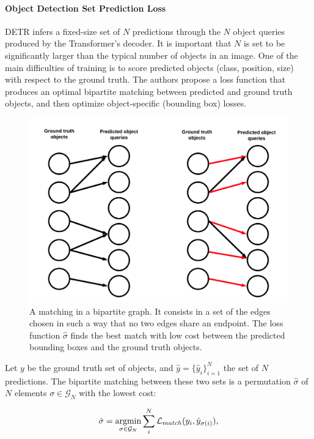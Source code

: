 \paragraph{Object Detection Set Prediction Loss} DETR \cite{detr} infers a fixed-size set of $N$ predictions through the $N$ object queries produced by the Transformer's decoder. It is important that $N$ is set to be significantly larger than the typical number of objects in an image. One of the main difficulties of training is to score predicted objects (class, position, size) with respect to the ground truth. The authors propose a loss function that produces
an optimal bipartite matching between predicted and ground truth objects, and
then optimize object-specific (bounding box) losses. 

\begin{figure}[h!]
	\centering
	\includegraphics[width=0.8\linewidth]{images/bipartitematching.png}
	\caption{A matching in a bipartite graph. It consists in a set of the edges chosen in such a way that no two edges share an endpoint. The loss function $\hat \sigma$ finds the best match with low cost between the predicted bounding boxes and the ground truth objects.}
	\label{}
\end{figure}

Let $y$ be the ground truth set of objects, and $\hat y = \{\hat y_i\}^{N}_{i = 1}$ the set of $N$ predictions. The bipartite matching between these two sets is a permutation $\hat \sigma$ of $N$ elements $\sigma \in \mathcal{G}_N$ with the lowest cost:

\begin{equation}
\label{formula:bipartitematching}
\hat \sigma = \operatorname*{argmin}_{\sigma \in \mathcal{G}_N} \sum_{i}^{N} \mathcal{L}_{match}(y_i, \hat y_{\sigma(i)}),
\end{equation}

